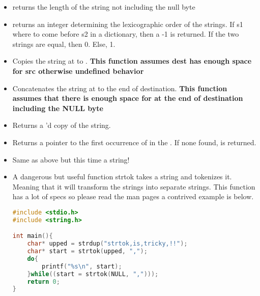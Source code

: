 \begin{itemize}

	\item {} returns the length of the string not including the null byte

	\item {} returns an integer determining the lexicographic order of the strings.
    If s1 where to come before s2 in a dictionary, then a -1 is returned.
    If the two strings are equal, then 0.
    Else, 1.

	\item {} Copies the string at  to .
    \textbf{This function assumes dest has enough space for src otherwise undefined behavior}

	\item {} Concatenates the string at  to the end of destination.
    \textbf{This function assumes that there is enough space for  at the end of destination including the NULL byte}

	\item {} Returns a 'd copy of the string.

	\item {} Returns a pointer to the first occurrence of  in the .
    If none found,  is returned.

	\item {} Same as above but this time a string!

	\item {}

	  A dangerous but useful function strtok takes a string and tokenizes it.
    Meaning that it will transform the strings into separate strings.
    This function has a lot of specs so please read the man pages a contrived example is below.

	      \begin{lstlisting}[language=C]
#include <stdio.h>
#include <string.h>

int main(){
    char* upped = strdup("strtok,is,tricky,!!");
    char* start = strtok(upped, ",");
    do{
        printf("%s\n", start);
    }while((start = strtok(NULL, ",")));
    return 0;
}
\end{lstlisting}


\end{itemize}

